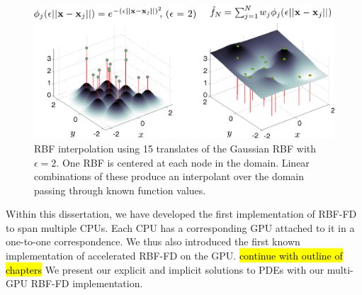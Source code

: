 \begin{figure}[t]
    \centering
    \includegraphics[scale=0.4]{figures/paper1/figures/trimmed_interpolate2D_ga__m.pdf}
    \caption{RBF interpolation using 15 translates of the Gaussian RBF with $\epsilon=2$. One RBF is centered at each node in the domain. Linear
    combinations of these produce an interpolant over the domain passing through known function values. }
    \label{fig:rbfInterpolation}
\end{figure}

Within this dissertation, we have developed the first implementation of RBF-FD
to span multiple CPUs. Each CPU has a corresponding GPU attached to it
in a one-to-one correspondence. We thus also introduced the first known 
implementation of accelerated RBF-FD on the GPU. \hl{continue with outline of chapters} 
We present our explicit and implicit solutions to PDEs with our multi-GPU RBF-FD implementation. 


